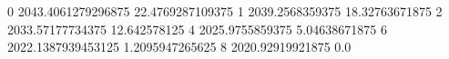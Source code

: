 0 2043.4061279296875 22.4769287109375
1 2039.2568359375 18.32763671875
2 2033.57177734375 12.642578125
4 2025.9755859375 5.04638671875
6 2022.1387939453125 1.2095947265625
8 2020.92919921875 0.0
